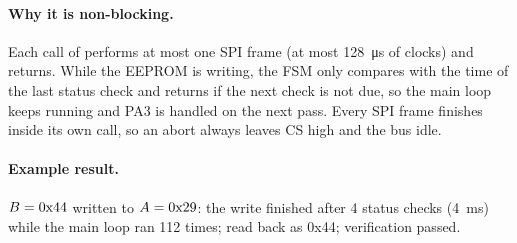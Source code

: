 \paragraph{Why it is non-blocking.}
Each call of  performs at most one SPI
frame (at most \SI{128}{\micro\second} of clocks) and returns. While the
EEPROM is writing, the FSM only compares  with the time of
the last status check and returns if the next check is not due, so the main
loop keeps running  and PA3 is handled on the next pass.
Every SPI frame finishes inside its own call, so an abort always leaves CS high
and the bus idle.

\paragraph{Example result.}
$B = \text{0x44}$ written to $A = \text{0x29}$: the write finished after
4 status checks (\SI{4}{\milli\second}) while the main loop ran 112 times; read
back as 0x44; verification passed.
